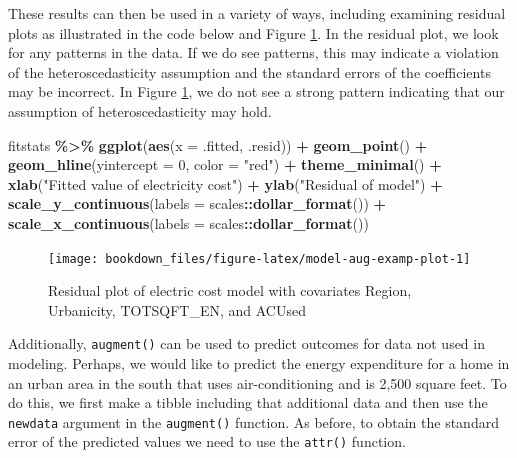 \documentclass[
]{krantz}
\makeatletter
\newenvironment{Shaded}{\begin{snugshade}}{\end{snugshade}}
\newcommand{\AttributeTok}[1]{\textcolor[rgb]{0.27,0.27,0.27}{#1}}
\newcommand{\DecValTok}[1]{\textcolor[rgb]{0.06,0.06,0.06}{#1}}
\newcommand{\FunctionTok}[1]{\textcolor[rgb]{0.27,0.27,0.27}{\textbf{#1}}}
\newcommand{\NormalTok}[1]{#1}
\newcommand{\SpecialCharTok}[1]{\textcolor[rgb]{0.43,0.43,0.43}{\textbf{#1}}}
\newcommand{\StringTok}[1]{\textcolor[rgb]{0.5,0.5,0.5}{#1}}
\newenvironment{kframe}{%
\medskip{}
\setlength{\fboxsep}{.8em}
 \def\at@end@of@kframe{}%
 \ifinner\ifhmode%
  \def\at@end@of@kframe{\end{minipage}}%
  \begin{minipage}{\columnwidth}%
 \fi\fi%
 \def\FrameCommand##1{\hskip\@totalleftmargin \hskip-\fboxsep
 \colorbox{shadecolor}{##1}\hskip-\fboxsep
     \hskip-\linewidth \hskip-\@totalleftmargin \hskip\columnwidth}%
 \MakeFramed {\advance\hsize-\width
   \@totalleftmargin\z@ \linewidth\hsize
   \@setminipage}}%
 {\par\unskip\endMakeFramed%
 \at@end@of@kframe}
\renewenvironment{Shaded}{\begin{kframe}}{\end{kframe}}
\makeatother
\begin{document}
These results can then be used in a variety of ways, including examining residual plots as illustrated in the code below and Figure \ref{fig:model-aug-examp-plot}. In the residual plot, we look for any patterns in the data. If we do see patterns, this may indicate a violation of the heteroscedasticity assumption and the standard errors of the coefficients may be incorrect. In Figure \ref{fig:model-aug-examp-plot}, we do not see a strong pattern indicating that our assumption of heteroscedasticity may hold.

\begin{Shaded}
\begin{Highlighting}[]
\NormalTok{fitstats }\SpecialCharTok{\%\textgreater{}\%}
  \FunctionTok{ggplot}\NormalTok{(}\FunctionTok{aes}\NormalTok{(}\AttributeTok{x =}\NormalTok{ .fitted, .resid)) }\SpecialCharTok{+}
  \FunctionTok{geom\_point}\NormalTok{() }\SpecialCharTok{+}
  \FunctionTok{geom\_hline}\NormalTok{(}\AttributeTok{yintercept =} \DecValTok{0}\NormalTok{, }\AttributeTok{color =} \StringTok{"red"}\NormalTok{) }\SpecialCharTok{+}
  \FunctionTok{theme\_minimal}\NormalTok{() }\SpecialCharTok{+}
  \FunctionTok{xlab}\NormalTok{(}\StringTok{"Fitted value of electricity cost"}\NormalTok{) }\SpecialCharTok{+}
  \FunctionTok{ylab}\NormalTok{(}\StringTok{"Residual of model"}\NormalTok{) }\SpecialCharTok{+}
  \FunctionTok{scale\_y\_continuous}\NormalTok{(}\AttributeTok{labels =}\NormalTok{ scales}\SpecialCharTok{::}\FunctionTok{dollar\_format}\NormalTok{()) }\SpecialCharTok{+}
  \FunctionTok{scale\_x\_continuous}\NormalTok{(}\AttributeTok{labels =}\NormalTok{ scales}\SpecialCharTok{::}\FunctionTok{dollar\_format}\NormalTok{())}
\end{Highlighting}
\end{Shaded}

\begin{figure}
\texttt{[image: bookdown\_files/figure-latex/model-aug-examp-plot-1]} \caption{Residual plot of electric cost model with covariates Region, Urbanicity, TOTSQFT\_EN, and ACUsed}\label{fig:model-aug-examp-plot}
\end{figure}

Additionally, \texttt{augment()} can be used to predict outcomes for data not used in modeling. Perhaps, we would like to predict the energy expenditure for a home in an urban area in the south that uses air-conditioning and is 2,500 square feet. To do this, we first make a tibble including that additional data and then use the \texttt{newdata} argument in the \texttt{augment()} function. As before, to obtain the standard error of the predicted values we need to use the \texttt{attr()} function.
\end{document}
